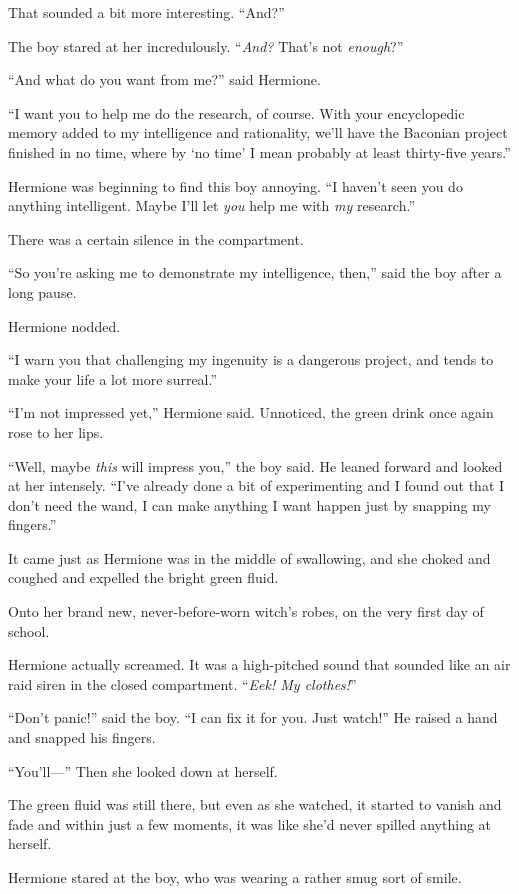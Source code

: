 That sounded a bit more interesting. “And?”

The boy stared at her incredulously. “\emph{And?} That’s not \emph{enough}?”

“And what do you want from me?” said Hermione.

“I want you to help me do the research, of course. With your encyclopedic memory added to my intelligence and rationality, we’ll have the Baconian project finished in no time, where by ‘no time’ I mean probably at least thirty-five years.”

Hermione was beginning to find this boy annoying. “I haven’t seen you do anything intelligent. Maybe I’ll let \emph{you} help me with \emph{my} research.”

There was a certain silence in the compartment.

“So you’re asking me to demonstrate my intelligence, then,” said the boy after a long pause.

Hermione nodded.

“I warn you that challenging my ingenuity is a dangerous project, and tends to make your life a lot more surreal.”

“I’m not impressed yet,” Hermione said. Unnoticed, the green drink once again rose to her lips.

“Well, maybe \emph{this} will impress you,” the boy said. He leaned forward and looked at her intensely. “I’ve already done a bit of experimenting and I found out that I don’t need the wand, I can make anything I want happen just by snapping my fingers.”

It came just as Hermione was in the middle of swallowing, and she choked and coughed and expelled the bright green fluid.

Onto her brand new, never-before-worn witch’s robes, on the very first day of school.

Hermione actually screamed. It was a high-pitched sound that sounded like an air raid siren in the closed compartment. “\emph{Eek! My clothes!}”

“Don’t panic!” said the boy. “I can fix it for you. Just watch!” He raised a hand and snapped his fingers.

“You’ll—” Then she looked down at herself.

The green fluid was still there, but even as she watched, it started to vanish and fade and within just a few moments, it was like she’d never spilled anything at herself.

Hermione stared at the boy, who was wearing a rather smug sort of smile.

